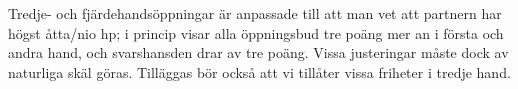 Tredje- och fjärdehandsöppningar är anpassade till att man vet att partnern
har högst åtta/nio hp; i princip visar alla öppningsbud tre poäng mer an i
första och andra hand, och svarshansden drar av tre poäng. Vissa
justeringar måste dock av naturliga skäl göras. Tilläggas bör också att vi
tillåter vissa friheter i tredje hand.


 




 


